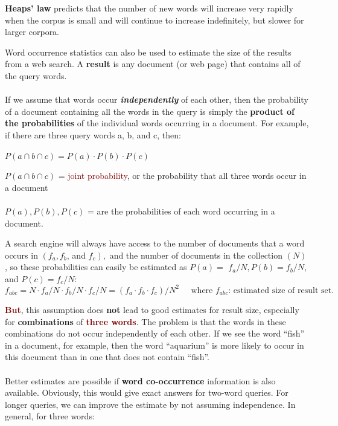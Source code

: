 \textbf{\textcolor{NavyBlue}{Heaps' law}} predicts that the number of new words will increase very rapidly when the corpus is small and will continue to increase indefinitely, but slower for larger corpora.
\newpage

Word occurrence statistics can also be used to estimate the size of the results from a web search. A \textbf{result} is any document (or web page) that contains all of the query words.  
\\
\\
If we assume that words occur \textbf{\textit{independently}} of each other, then the probability of a document containing all the words in the query is simply the \textbf{product of the probabilities} of the individual words occurring in a document. For example, if there are three query words a, b, and c, then:\\

\begin{minipage}{.4\textwidth}
$P(a \cap b \cap c)=P(a) \cdot P(b) \cdot P(c)$
\end{minipage}
\begin{minipage}{.6\textwidth}
$P(a \cap b \cap c)$ = \textcolor{Maroon}{joint probability}, or the probability that all three words occur in a document \\
\\
$P(a), P(b), P(c)$ =  are the probabilities of each word occurring in a document.
\end{minipage}
\vspace{0.25cm}

A search engine will always have access to the number of documents that a word occurs in $\left(f_{a}, f_{b}\right.$, and $\left.f_{c}\right),$ and the number of documents in the collection $(N)$, so these probabilities can easily be estimated as $P(a)=$ $f_{a} / N, P(b)=f_{b} / N$, and $P(c)=f_{c} / N$:
$$f_{a b c}=N \cdot f_{a} / N \cdot f_{b} / N \cdot f_{c} / N=\left(f_{a} \cdot f_{b} \cdot f_{c}\right) / N^{2} \;\;\;\;\; \text{where $f_{abc}$: estimated size of result set.}$$

\textbf{\textcolor{Maroon}{But}}, this assumption does \textbf{not} lead to good estimates for result size, especially for \textbf{combinations} of \textbf{\textcolor{Maroon}{three words}}. The problem is that the words in these combinations do not occur independently of each other. If we see the word “fish” in a document, for example, then the word “aquarium” is more likely to occur in this document than in one that does not contain “fish”.
\\
\\
Better estimates are possible if \textbf{\textcolor{NavyBlue}{word co-occurrence}} information is also available. Obviously, this would give exact answers for two-word queries. For longer queries, we can improve the estimate by not assuming independence. In general, for three words:
\\

